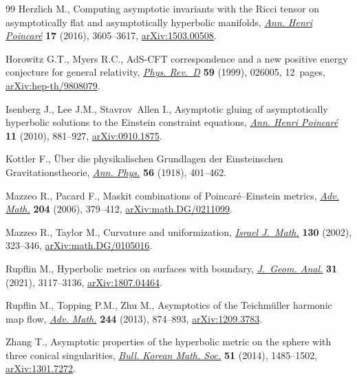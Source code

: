 \documentclass[pdftex]{sigma}
\numberwithin{equation}{section}
\begin{document}
\begin{thebibliography}{99}
Herzlich M., Computing asymptotic invariants with the {R}icci tensor on
 asymptotically flat and asymptotically hyperbolic manifolds, \href{https://doi.org/10.1007/s00023-016-0494-5}{\textit{Ann.
 Henri Poincar\'e}} \textbf{17} (2016), 3605--3617, \href{https://arxiv.org/abs/1503.00508}{arXiv:1503.00508}.

Horowitz G.T., Myers R.C., Ad{S}-{CFT} correspondence and a new positive energy
 conjecture for general relativity, \href{https://doi.org/10.1103/PhysRevD.59.026005}{\textit{Phys. Rev.~D}} \textbf{59} (1999),
 026005, 12~pages, \href{https://arxiv.org/abs/hep-th/9808079}{arXiv:hep-th/9808079}.

Isenberg J., Lee J.M., Stavrov~Allen I., Asymptotic gluing of asymptotically
 hyperbolic solutions to the {E}instein constraint equations, \href{https://doi.org/10.1007/s00023-010-0049-0}{\textit{Ann.
 Henri Poincar\'e}} \textbf{11} (2010), 881--927, \href{https://arxiv.org/abs/0910.1875}{arXiv:0910.1875}.

Kottler F., \"Uber die physikalischen Grundlagen der Einsteinschen
 Gravitationstheorie, \href{https://doi.org/10.1002/andp.19183611402}{\textit{Ann. Phys.}} \textbf{56} (1918), 401--462.

Mazzeo R., Pacard F., Maskit combinations of {P}oincar\'e--{E}instein metrics,
 \href{https://doi.org/10.1016/j.aim.2005.06.001}{\textit{Adv. Math.}} \textbf{204} (2006), 379--412, \href{https://arxiv.org/abs/math.DG/0211099}{arXiv:math.DG/0211099}.

Mazzeo R., Taylor M., Curvature and uniformization, \href{https://doi.org/10.1007/BF02764082}{\textit{Israel J.~Math.}}
 \textbf{130} (2002), 323--346, \href{https://arxiv.org/abs/math.DG/0105016}{arXiv:math.DG/0105016}.

Rupflin M., Hyperbolic metrics on surfaces with boundary, \href{https://doi.org/10.1007/s12220-020-00386-2}{\textit{J.~Geom.
 Anal.}} \textbf{31} (2021), 3117--3136, \href{https://arxiv.org/abs/1807.04464}{arXiv:1807.04464}.

Rupflin M., Topping P.M., Zhu M., Asymptotics of the {T}eichm\"uller harmonic
 map flow, \href{https://doi.org/10.1016/j.aim.2013.05.021}{\textit{Adv. Math.}} \textbf{244} (2013), 874--893,
 \href{https://arxiv.org/abs/1209.3783}{arXiv:1209.3783}.

Zhang T., Asymptotic properties of the hyperbolic metric on the sphere with
 three conical singularities, \href{https://doi.org/10.4134/BKMS.2014.51.5.1485}{\textit{Bull. Korean Math. Soc.}} \textbf{51}
 (2014), 1485--1502, \href{https://arxiv.org/abs/1301.7272}{arXiv:1301.7272}.

\end{thebibliography}\LastPageEnding
\end{document}
